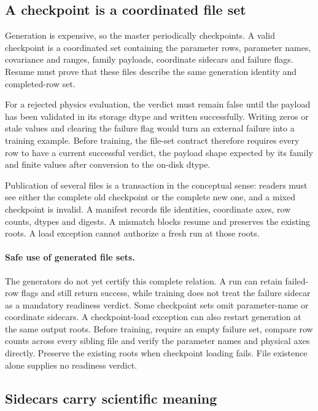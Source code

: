 \documentclass[10pt,aps,prd,twocolumn,nofootinbib]{revtex4-2}
\begin{document}
\subsection{A checkpoint is a coordinated file set}

Generation is expensive, so the master periodically checkpoints.  A valid
checkpoint is a coordinated set containing the parameter rows, parameter
names, covariance and ranges,
family payloads, coordinate sidecars and failure flags.  Resume must prove
that these files describe the same generation identity and completed-row set.

For a rejected physics evaluation, the verdict must remain false until the
payload has been validated in its storage dtype and written successfully.
Writing zeros or stale values and clearing the failure flag would turn an
external failure into a training example.  Before training, the file-set
contract therefore requires every row to have a current successful verdict,
the payload shape expected by its family and finite values after conversion
to the on-disk dtype.

Publication of several files is a transaction in the conceptual sense:
readers must see either the complete old checkpoint or the complete new one,
and a mixed checkpoint is invalid.  A manifest records file identities, coordinate axes, row
counts, dtypes and digests.  A mismatch blocks resume and preserves the
existing roots.  A load exception cannot authorize a fresh run at those roots.

\paragraph{Safe use of generated file sets.}
The generators do not yet certify this complete relation.  A run can retain
failed-row flags and still return success, while training does not treat the
failure sidecar as a mandatory readiness verdict.  Some checkpoint sets omit
parameter-name or coordinate sidecars.  A checkpoint-load exception can also
restart generation at the same output roots.  Before training, require an
empty failure set, compare row counts across every sibling file and verify the
parameter names and physical axes directly.  Preserve the existing roots when
checkpoint loading fails.  File existence alone supplies no readiness verdict.

\subsection{Sidecars carry scientific meaning}
\end{document}

